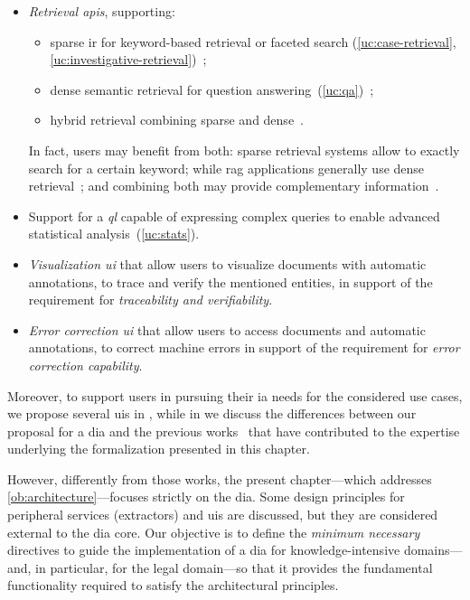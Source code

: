 \begin{itemize}
    \item \textit{Retrieval \acp{api}}, supporting:
      \begin{itemize}[nosep]
        \item sparse \acf{ir} for keyword-based retrieval or faceted search
              (\ref{uc:case-retrieval}, \ref{uc:investigative-retrieval})~\cite{ARMENTANO2014_nlp_faceted,hearst_2006_faceted};
        \item dense semantic retrieval for question answering~(\ref{uc:qa})~\cite{negar_sparse_dense_retrieval_2021};
        \item hybrid retrieval combining sparse and dense~\cite{negar_sparse_dense_retrieval_2021}.
      \end{itemize}
      In fact, users may benefit from both: sparse retrieval systems allow to exactly search for a certain keyword; while \ac{rag} applications generally use dense retrieval~\cite{old_ir_methods_rag_2024}; and combining both may provide complementary information~\cite{negar_sparse_dense_retrieval_2021}.
    \item Support for a \emph{\acf{ql}} capable of expressing complex queries to enable advanced statistical analysis~(\ref{uc:stats}).
    \item \emph{Visualization \ac{ui}} that allow users to visualize documents with automatic annotations, to trace and verify the mentioned entities, in support of the requirement for \emph{traceability and verifiability}.
    \item \emph{Error correction \ac{ui}} that allow users to access documents and automatic annotations, to correct machine errors in support of the requirement for \emph{error correction capability}.
\end{itemize}
Moreover, to support users in pursuing their \acl{ia} needs for the considered use cases, we propose several \acp{ui} in , while in  we discuss the differences between our proposal for a \acf{dia} and the previous works~\cite{BELLANDI2024,pozzi_wise_2025,Agazzi2025DAVE} that have contributed to the expertise underlying the formalization presented in this chapter.

However, differently from those works, the present chapter---which addresses \ref{ob:architecture}---focuses strictly on the \acl{dia}. Some design principles for peripheral services (\eg extractors) and \acp{ui} are discussed, but they are considered external to the \ac{dia} core. Our objective is to define the \emph{minimum necessary} directives to guide the implementation of a \acl{dia} for knowledge-intensive domains---and, in particular, for the legal domain---so that it provides the fundamental functionality required to satisfy the architectural principles.







